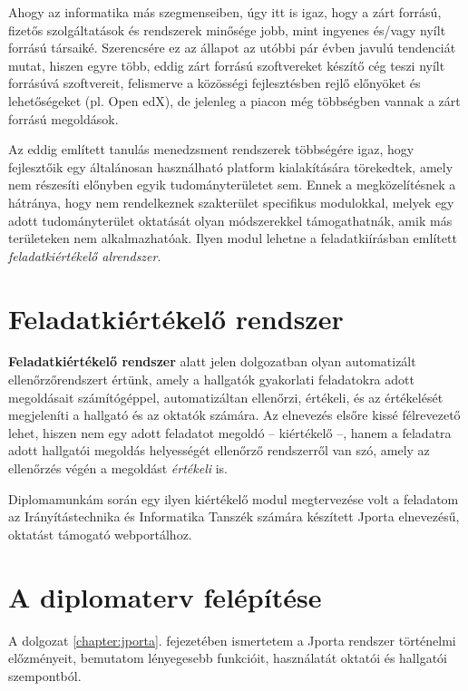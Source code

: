 Ahogy az informatika más szegmenseiben, úgy itt is igaz, hogy a zárt forrású, fizetős szolgáltatások és rendszerek minősége jobb, mint ingyenes és/vagy nyílt forrású társaiké.
Szerencsére ez az állapot az utóbbi pár évben javulú tendenciát mutat, hiszen egyre több, eddig zárt forrású szoftvereket készítő cég teszi nyílt forrásúvá szoftvereit, felismerve a közösségi fejlesztésben rejlő előnyöket és lehetőségeket (pl. Open edX), de jelenleg a piacon még többségben vannak a zárt forrású megoldások.

Az eddig említett tanulás menedzsment rendszerek többségére igaz, hogy fejlesztőik egy általánosan használható platform kialakítására törekedtek, amely nem részesíti előnyben egyik tudományterületet sem.
Ennek a megközelítésnek a hátránya, hogy nem rendelkeznek szakterület specifikus modulokkal, melyek egy adott tudományterület oktatását olyan módszerekkel támogathatnák, amik más területeken nem alkalmazhatóak.
Ilyen modul lehetne a feladatkiírásban említett \textit{feladatkiértékelő alrendszer}.

\section*{Feladatkiértékelő rendszer}
\textbf{Feladatkiértékelő rendszer} alatt jelen dolgozatban olyan automatizált ellenőrzőrendszert értünk, amely a hallgatók gyakorlati feladatokra adott megoldásait számítógéppel, automatizáltan ellenőrzi, értékeli, és az értékelését megjeleníti a hallgató és az oktatók számára.
Az elnevezés elsőre kissé félrevezető lehet, hiszen nem egy adott feladatot megoldó -- kiértékelő --, hanem a feladatra adott hallgatói megoldás helyességét ellenőrző rendszerről van szó, amely az ellenőrzés végén a megoldást \textit{értékeli} is.

Diplomamunkám során egy ilyen kiértékelő modul megtervezése volt a feladatom az Irányítástechnika és Informatika Tanszék számára készített Jporta elnevezésű, oktatást támogató webportálhoz.

\section*{A diplomaterv felépítése}
A dolgozat \ref{chapter:jporta}. fejezetében ismertetem a Jporta rendszer történelmi előzményeit, bemutatom lényegesebb funkcióit, használatát oktatói és hallgatói szempontból.

